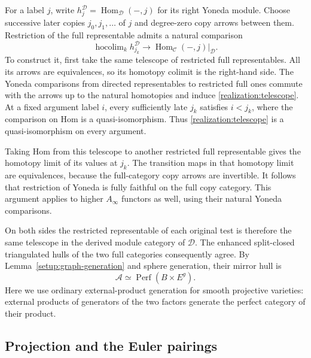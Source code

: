 \documentclass[11pt]{article}
\numberwithin{equation}{section}
\theoremstyle{definition}
\theoremstyle{remark}
\DeclareMathOperator{\Hom}{Hom}
\DeclareMathOperator{\Perf}{Perf}
\begin{document}
For a label $j$, write $h_j^{\mathcal D}=\Hom_{\mathcal D}(-,j)$ for its
right Yoneda module.  Choose successive later copies
$j_0,j_1,\ldots$ of $j$ and degree-zero copy arrows between them.
Restriction of the full representable admits a natural comparison
\begin{equation}
 \mathop{\operatorname{hocolim}}_k h_{j_k}^{\mathcal D}
 \longrightarrow
 \Hom_{\mathcal C}(-,j)|_{\mathcal D}.
 \label{realization:telescope}
\end{equation}
To construct it, first take the same telescope of restricted full
representables.  All its arrows are equivalences, so its homotopy
colimit is the right-hand side.  The Yoneda comparisons from directed
representables to restricted full ones commute with the arrows up to
the natural homotopies and induce \eqref{realization:telescope}.
At a fixed argument label $i$, every sufficiently late $j_k$ satisfies
$i<j_k$, where the comparison on Hom is a quasi-isomorphism.
Thus \eqref{realization:telescope} is a quasi-isomorphism on every
argument.

Taking Hom from this telescope to another restricted full
representable gives the homotopy limit of its values at $j_k$.
The transition maps in that homotopy limit are equivalences, because
the full-category copy arrows are invertible.  It follows that
restriction of Yoneda is fully faithful on the full copy category.
This argument applies to higher $A_\infty$ functors as well, using
their natural Yoneda comparisons.

On both sides the restricted representable of each original test is
therefore the same telescope in the derived module category of
$\mathcal D$.  The enhanced split-closed triangulated hulls of the two
full categories consequently agree.  By
Lemma~\ref{setup:graph-generation} and sphere generation, their mirror
hull is
\begin{equation}
 \mathcal A\simeq\Perf(B\times E^g).
 \label{realization:mirror-hull}
\end{equation}
Here we use ordinary external-product generation for smooth projective
varieties: external products of generators of the two factors generate
the perfect category of their product.

\subsection{Projection and the Euler pairings}
\end{document}
